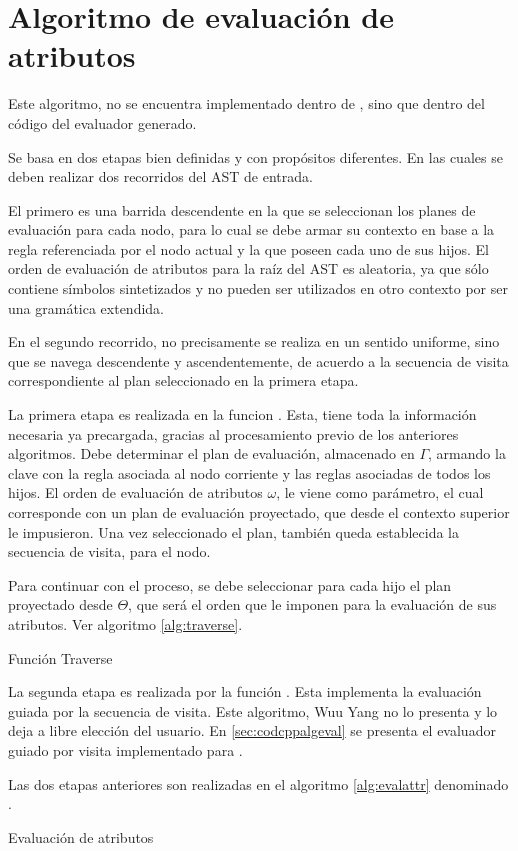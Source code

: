\section{Algoritmo de evaluación de atributos}
\label{sec:algevalattr}

Este algoritmo, no se encuentra implementado dentro de \maggen, sino que dentro del código del evaluador generado.

Se basa en dos etapas bien definidas y con propósitos diferentes. En las cuales se deben realizar dos recorridos del AST de entrada.

El primero es una barrida descendente en la que se seleccionan los planes de evaluación para cada nodo, para lo cual se debe armar su contexto en base a la regla referenciada por el nodo actual y la que poseen cada uno de sus hijos. El orden de evaluación de atributos para la raíz del AST es aleatoria, ya que sólo contiene símbolos sintetizados y no pueden ser utilizados en otro contexto por ser una gramática extendida.

En el segundo recorrido, no precisamente se realiza en un sentido uniforme, sino que se navega descendente y ascendentemente, de acuerdo a la secuencia de visita correspondiente al plan seleccionado en la primera etapa. 

La primera etapa es realizada en la funcion . Esta, tiene toda la información necesaria ya precargada, gracias al procesamiento previo de los anteriores algoritmos. Debe determinar el plan de evaluación, almacenado en $\Gamma$, armando la clave con la regla asociada al nodo corriente y las reglas asociadas de todos los hijos. El orden de evaluación de atributos $\omega$, le viene como parámetro, el cual corresponde con un plan de evaluación proyectado, que desde el contexto superior le impusieron. Una vez seleccionado el plan, también queda establecida la secuencia de visita, para el nodo.

Para continuar con el proceso, se debe seleccionar para cada hijo el plan proyectado desde $\Theta$, que será el orden que le imponen para la evaluación de sus atributos. Ver algoritmo \ref{alg:traverse}.

\begin{algorithm}[!ht]

\caption{\label{alg:traverse} Función Traverse}
\end{algorithm}

La segunda etapa es realizada por la función . Esta implementa la evaluación guiada por la secuencia de visita. Este algoritmo, Wuu Yang no lo presenta y lo deja a libre elección del usuario. En \ref{sec:codcppalgeval} se presenta el evaluador guiado por visita implementado para \maggen. 


Las dos etapas anteriores son realizadas en el algoritmo \ref{alg:evalattr} denominado . 

\begin{algorithm}[!ht]

\caption{\label{alg:evalattr} Evaluación de atributos}
\end{algorithm}